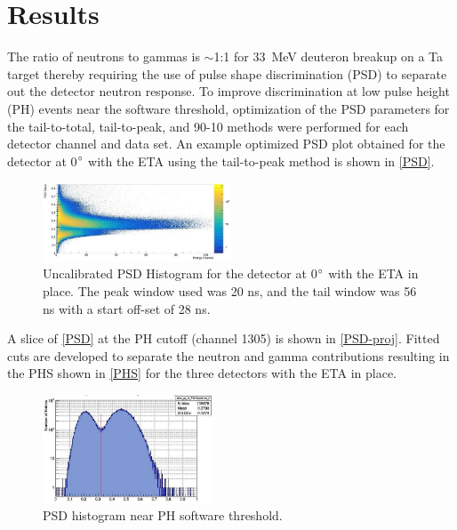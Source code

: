\documentclass[twocolumn,10pt,final]{asme2ej}
\begin{document}
\vspace{-0.4 cm}
\section{Results} \label{sec:results}
The ratio of neutrons to gammas is $\sim$1:1 for 33~MeV deuteron breakup on a Ta target thereby requiring the use of pulse shape discrimination (PSD) to separate out the detector neutron response.
To improve discrimination at low pulse height (PH) events near the software threshold, optimization of the PSD parameters for the tail-to-total, tail-to-peak, and 90-10 methods were performed for each detector channel and data set.  
An example optimized PSD plot obtained for the detector at 0$\degree$ with the ETA using the tail-to-peak method is shown in \autoref{PSD}. 

\vspace{-0.4 cm}
\begin{figure} [htp!]
 \centering
 \includegraphics[trim = 0cm 0cm 0cm 0cm, clip, width=0.5\textwidth]{../Figs/psd.jpg}
   \caption{Uncalibrated PSD Histogram for the detector at 0$\degree$ with the ETA in place. The peak window used was 20 ns, and the tail window was 56 ns with a start off-set of 28 ns.}
  \label{PSD}
\vspace{-0.4 cm}
\end{figure}

A slice of \autoref{PSD} at the PH cutoff (channel 1305) is shown in \autoref{PSD-proj}.
Fitted cuts are developed to separate the neutron and gamma contributions resulting in the PHS shown in \autoref{PHS} for the three detectors with the ETA in place.

\vspace{-0.4 cm}
\begin{figure} [htp!]
 \centering
 \includegraphics[trim = 0cm 0cm 0cm 0cm, clip, width=0.45\textwidth]{../Figs/psd-proj.jpg}
   \caption{PSD histogram near PH software threshold.}
  \label{PSD-proj}
\vspace{-0.4 cm}
\end{figure}
\end{document}
